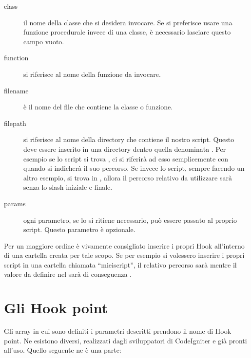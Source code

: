\begin{description}
\item[class] il nome della classe che si desidera invocare. Se si preferisce usare una funzione procedurale invece di una classe, è necessario lasciare questo campo vuoto.
\item[function] si riferisce al nome della funzione da invocare.
\item[filename] è il nome del file che contiene la classe o funzione.
\item[filepath] si riferisce al nome della directory che contiene il nostro script. Questo deve essere inserito in una directory dentro quella denominata . Per esempio se lo script si trova , ci si riferirà ad esso semplicemente con  quando si indicherà il suo percorso. Se invece lo script, sempre facendo un altro esempio, si trova in , allora il percorso relativo da utilizzare sarà  senza lo slash \var{/} iniziale e finale.
\item[params]  ogni parametro, se lo si ritiene necessario, può essere passato al proprio script. Questo parametro è opzionale.
\end{description}

Per un maggiore ordine è vivamente consigliato inserire i propri Hook all'interno di una cartella creata per tale scopo. Se per esempio si volessero inserire i propri script in una cartella chiamata ``mieiscript'', il relativo percorso sarà  mentre il valore da definire nel  sarà di conseguenza .

\section{Gli Hook point}
Gli array in cui sono definiti i parametri descritti prendono il nome di Hook point. Ne esistono diversi, realizzati dagli sviluppatori di CodeIgniter e già pronti all'uso. Quello seguente ne è una parte:

